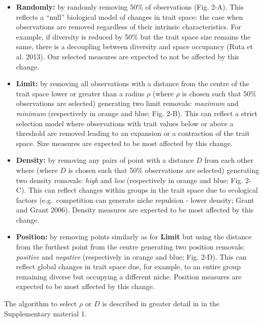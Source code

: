 \documentclass[]{article}
\begin{document}
\begin{itemize}
\item
  \textbf{Randomly:} by randomly removing 50\% of observations (Fig.
  2-A). This reflects a ``null'' biological model of changes in trait
  space: the case when observations are removed regardless of their
  intrinsic characteristics. For example, if diversity is reduced by
  50\% but the trait space size remains the same, there is a decoupling
  between diversity and space occupancy (Ruta et al. 2013). Our selected
  measures are expected to not be affected by this change.
\item
  \textbf{Limit:} by removing all observations with a distance from the
  centre of the trait space lower or greater than a radius \(\rho\)
  (where \(\rho\) is chosen such that 50\% observations are selected)
  generating two limit removals: \emph{maximum} and \emph{minimum}
  (respectively in orange and blue; Fig. 2-B). This can reflect a strict
  selection model where observations with trait values below or above a
  threshold are removed leading to an expansion or a contraction of the
  trait space. Size measures are expected to be most affected by this
  change.
\item
  \textbf{Density:} by removing any pairs of point with a distance \(D\)
  from each other where (where \(D\) is chosen such that 50\%
  observations are selected) generating two density removals:
  \emph{high} and \emph{low} (respectively in orange and blue; Fig.
  2-C). This can reflect changes within groups in the trait space due to
  ecological factors (e.g.~competition can generate niche repulsion -
  lower density; Grant and Grant 2006). Density measures are expected to
  be most affected by this change.
\item
  \textbf{Position:} by removing points similarly as for \textbf{Limit}
  but using the distance from the furthest point from the centre
  generating two position removals: \emph{positive} and \emph{negative}
  (respectively in orange and blue; Fig. 2-D). This can reflect global
  changes in trait space due, for example, to an entire group remaining
  diverse but occupying a different niche. Position measures are
  expected to be most affected by this change.
\end{itemize}

The algorithm to select \(\rho\) or \(D\) is described in greater detail
in in the Supplementary material 1.
\end{document}
